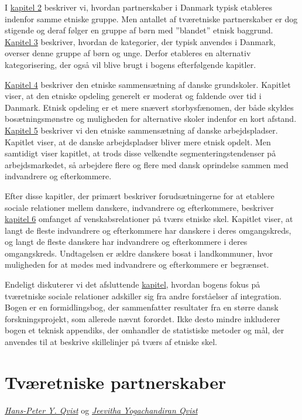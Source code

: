\documentclass[
]{book}
\begin{document}
I \hyperref[kap2]{kapitel 2} beskriver vi, hvordan partnerskaber i Danmark typisk etableres indenfor samme etniske gruppe. Men antallet af tværetniske partnerskaber er dog stigende og deraf følger en gruppe af børn med ''blandet'' etnisk baggrund. \hyperref[kap3]{Kapitel 3} beskriver, hvordan de kategorier, der typisk anvendes i Danmark, overser denne gruppe af børn og unge. Derfor etableres en alternativ kategorisering, der også vil blive brugt i bogens efterfølgende kapitler.

\hyperref[kap4]{Kapitel 4} beskriver den etniske sammensætning af danske grundskoler. Kapitlet viser, at den etniske opdeling generelt er moderat og faldende over tid i Danmark. Etnisk opdeling er et mere snævert storbysfænomen, der både skyldes bosætningsmønstre og muligheden for alternative skoler indenfor en kort afstand. \hyperref[kap5]{Kapitel 5} beskriver vi den etniske sammensætning af danske arbejdspladser. Kapitlet viser, at de danske arbejdspladser bliver mere etnisk opdelt. Men samtidigt viser kapitlet, at trods disse velkendte segmenteringstendenser på arbejdsmarkedet, så arbejdere flere og flere med dansk oprindelse sammen med indvandrere og efterkommere.

Efter disse kapitler, der primært beskriver forudsætningerne for at etablere sociale relationer mellem danskere, indvandrere og efterkommere, beskriver \hyperref[kap6]{kapitel 6} omfanget af venskabsrelationer på tværs etniske skel. Kapitlet viser, at langt de fleste indvandrere og efterkommere har danskere i deres omgangskreds, og langt de fleste danskere har indvandrere og efterkommere i deres omgangskreds. Undtagelsen er ældre danskere bosat i landkommuner, hvor muligheden for at mødes med indvandrere og efterkommere er begrænset.

Endeligt diskuterer vi det afsluttende \hyperref[kap7]{kapitel}, hvordan bogens fokus på tværetniske sociale relationer adskiller sig fra andre forståelser af integration. Bogen er en formidlingsbog, der sammenfatter resultater fra en større dansk forskningsprojekt, som allerede nævnt forordet. Ikke desto mindre inkluderer bogen et teknisk appendiks, der omhandler de statistiske metoder og mål, der anvendes til at beskrive skillelinjer på tværs af etniske skel.

\chapter{Tværetniske partnerskaber}\label{kap2}

\emph{\href{https://vbn.aau.dk/da/persons/hpq}{Hans-Peter Y. Qvist}} og \emph{\href{https://vbn.aau.dk/da/persons/jy}{Jeevitha Yogachandiran Qvist}}
\end{document}
